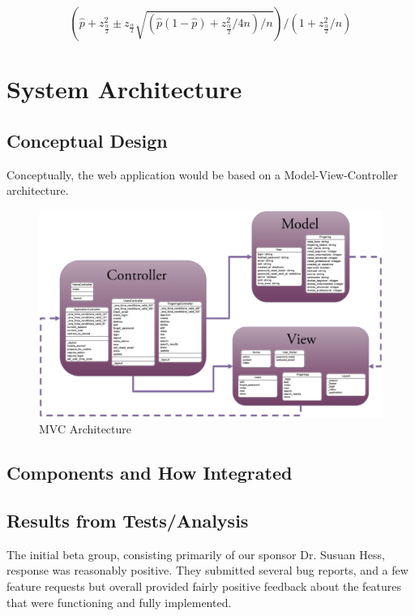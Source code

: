 \documentclass[12pt,english]{article}
\begin{document}
\[
(\hat{p}+z_{\frac{\alpha}{2}}^{2}\pm z_{\frac{\alpha}{2}}\sqrt{(\hat{p}(1-\hat{p})+z_{\frac{\alpha}{2}}^{2}/4n)/n})/(1+z_{\frac{\alpha}{2}}^{2}/n)
\]



\section{System Architecture}


\subsection{Conceptual Design}

Conceptually, the web application would be based on a Model-View-Controller
architecture.

\begin{figure}[H]
 \caption{MVC Architecture}


\includegraphics[scale=0.15]{MVC} 
\end{figure}



\subsection{Components and How Integrated}


\subsection{Results from Tests/Analysis}

The initial beta group, consisting primarily of our sponsor Dr. Susuan Hess,
response was reasonably positive.  They submitted several bug reports, 
and a few feature requests but overall provided fairly positive feedback 
about the features that were functioning and fully implemented.
\end{document}
